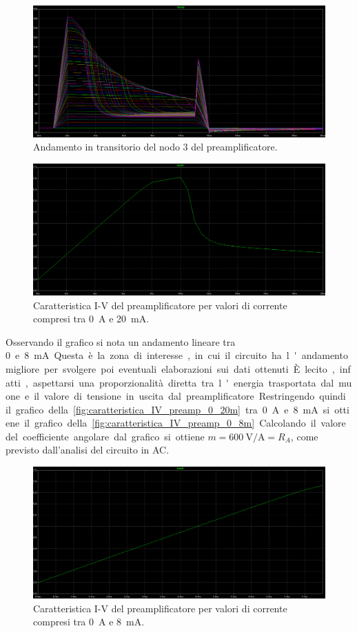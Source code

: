 \begin{figure}[h!]
    \centering
    \includegraphics[width=.65\linewidth]{img/out_tran_0_20m.png}
    \caption{Andamento in transitorio del nodo $3$ del preamplificatore.}
    \label{fig:out_tran_0_20m}
\end{figure}
\begin{figure}[h!]
    \centering
    \includegraphics[width=.65\linewidth]{img/caratteristica_IV_preamp_0_20m.png}
    \caption{Caratteristica I-V del preamplificatore per valori di corrente compresi tra \SI{0}{\ampere} e \SI{20}{\milli\ampere}.}
    \label{fig:caratteristica_IV_preamp_0_20m}
\end{figure}

Osservando il grafico si nota un andamento lineare tra \SI{0} e \SI{8}{\milli\ampere}. Questa è la zona di interesse, in cui il circuito
ha l'andamento migliore per svolgere poi eventuali elaborazioni sui dati ottenuti. È lecito, infatti, aspettarsi una proporzionalità diretta tra 
l'energia trasportata dal muone e il valore di tensione in uscita dal preamplificatore. Restringendo quindi il grafico della \autoref*{fig:caratteristica_IV_preamp_0_20m}
tra \SI{0}{\ampere} e \SI{8}{\milli\ampere} si ottiene il grafico della\autoref*{fig:caratteristica_IV_preamp_0_8m}. Calcolando il valore del 
coefficiente angolare dal grafico si ottiene $m=\SI{600}{\volt/\ampere}=R_A$, come previsto dall'analisi del circuito in AC.
\begin{figure}[h!]
    \centering
    \includegraphics[width=.65\linewidth]{img/caratteristica_IV_preamp_0_8m.png}
    \caption{Caratteristica I-V del preamplificatore per valori di corrente compresi tra \SI{0}{\ampere} e \SI{8}{\milli\ampere}.}
    \label{fig:caratteristica_IV_preamp_0_8m}
\end{figure}
